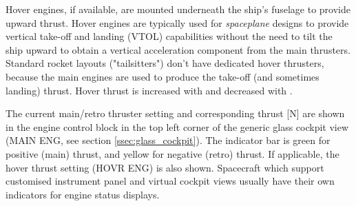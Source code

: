 \documentclass[Orbiter User Manual.tex]{subfiles}
\begin{document}

Hover engines, if available, are mounted underneath the ship's fuselage to
provide upward thrust. Hover engines are typically used for \emph{spaceplane}
designs to provide vertical take-off and landing (VTOL) capabilities without the
need to tilt the ship upward to obtain a vertical acceleration component from
the main thrusters. Standard rocket layouts ("tailsitters") don't have dedicated
hover thrusters, because the main engines are used to produce the take-off (and
sometimes landing) thrust. Hover thrust is increased with \num{}
and decreased with \num{}.

The current main/retro thruster setting and corresponding thrust [N] are shown
in the engine control block in the top left corner of the generic glass cockpit
view (MAIN ENG, see section \ref{ssec:glass_cockpit}). The indicator bar is
green for positive (main) thrust, and yellow for negative (retro) thrust. If
applicable, the hover thrust setting (HOVR ENG) is also shown. Spacecraft which
support customised instrument panel and virtual cockpit views usually have their
own indicators for engine status displays.
\end{document}
